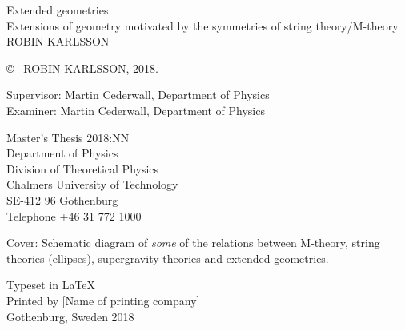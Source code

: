\newpage
\thispagestyle{plain}
\vspace*{4.5cm}
Extended geometries\\
Extensions of geometry motivated by the symmetries of string theory/M-theory\\
ROBIN KARLSSON \setlength{\parskip}{1cm}

\copyright ~ ROBIN KARLSSON, 2018. \setlength{\parskip}{1cm}

Supervisor: Martin Cederwall, Department of Physics\\
Examiner: Martin Cederwall, Department of Physics \setlength{\parskip}{1cm}

Master's Thesis 2018:NN\\	%
Department of Physics\\
Division of Theoretical Physics\\
Chalmers University of Technology\\
SE-412 96 Gothenburg\\
Telephone +46 31 772 1000 \setlength{\parskip}{0.5cm}

\vfill
Cover: Schematic diagram of \emph{some} of the relations between M-theory, string theories (ellipses), supergravity theories and extended geometries. \setlength{\parskip}{0.5cm}

Typeset in \LaTeX \\
Printed by [Name of printing company]\\
Gothenburg, Sweden 2018

